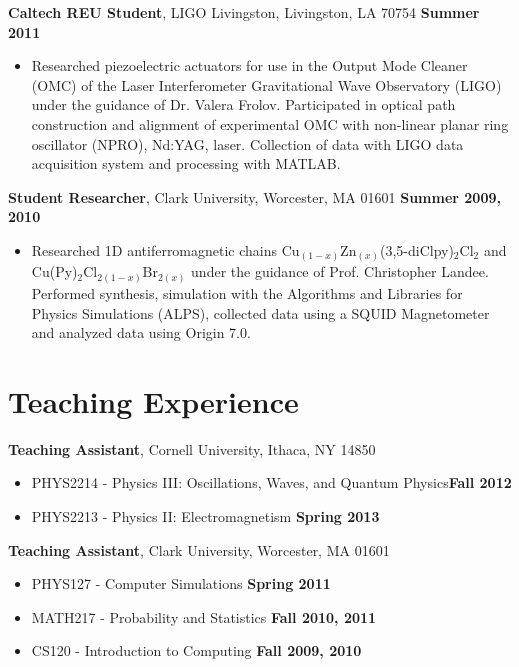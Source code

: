 \documentclass[margin,line]{res}
\begin{document}
\begin{resume}
    \textbf{Caltech REU Student}, LIGO Livingston, Livingston, LA 70754 \hfill \textbf{Summer 2011}
    \vspace*{1mm}
    \begin{itemize}
        \item [ ] Researched piezoelectric actuators for use in the
        Output Mode Cleaner (OMC) of the Laser Interferometer Gravitational Wave
        Observatory (LIGO) under the guidance of Dr. Valera Frolov. Participated in
        optical path construction and alignment of experimental OMC with non-linear
        planar ring oscillator (NPRO), Nd:YAG, laser. Collection of data with LIGO data
        acquisition system and processing with MATLAB.
    \end{itemize} 

\pagebreak

    \textbf{Student Researcher}, Clark University, Worcester, MA 01601 \hfill \textbf{Summer 2009, 2010}
    \vspace*{1mm}
    \begin{itemize}
        \item [ ] Researched 1D antiferromagnetic chains
        Cu$_{(1-x)}$Zn$_{(x)}$(3,5-diClpy)$_2$Cl$_2$ and\\
        Cu(Py)$_2$Cl$_{2(1-x)}$Br$_{2(x)}$ under the guidance of Prof. Christopher
        Landee. Performed synthesis, simulation with the Algorithms and
        Libraries for Physics Simulations (ALPS), collected data using a SQUID
        Magnetometer and analyzed data using Origin 7.0.
    \end{itemize} 
    
\section{\sc Teaching Experience} 
    \textbf{Teaching Assistant}, Cornell University, Ithaca, NY 14850
    \vspace*{1mm}
    \begin{itemize} 
        \item [ ] PHYS2214 - Physics III: Oscillations, Waves, and Quantum Physics\hfill \textbf{Fall 2012}
        \item [ ] PHYS2213 - Physics II: Electromagnetism \hfill \textbf{Spring 2013}
    \end{itemize} 
    
    \textbf{Teaching Assistant}, Clark University, Worcester, MA 01601
    \vspace*{1mm}
    \begin{itemize} 
        \item [ ] PHYS127 - Computer Simulations \hfill \textbf{Spring 2011}
        \item [ ] MATH217 - Probability and Statistics \hfill \textbf{Fall 2010, 2011}
        \item [ ] CS120 - Introduction to Computing \hfill \textbf{Fall 2009, 2010}
    \end{itemize} 


\end{resume}
\end{document}
